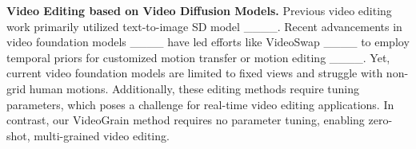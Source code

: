 \noindent\textbf{Video Editing based on Video Diffusion Models.}
Previous video editing work primarily utilized text-to-image SD model ____. 
Recent advancements in video foundation models ____ have led efforts like VideoSwap ____ to employ temporal priors for customized motion transfer or motion editing ____.
Yet, current video foundation models are limited to fixed views and struggle with non-grid human motions. Additionally, these editing methods require tuning parameters, which poses a challenge for real-time video editing applications. In contrast, our VideoGrain method requires no parameter tuning, enabling zero-shot, multi-grained video editing.

\iffalse